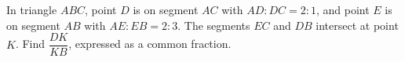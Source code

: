In triangle $ABC$, point $D$ is on segment $AC$ with $AD:DC=2:1$, and point $E$ is on segment $AB$ with $AE:EB=2:3$. The segments $EC$ and $DB$ intersect at point $K$. Find $\dfrac{DK}{KB}$, expressed as a common fraction.
